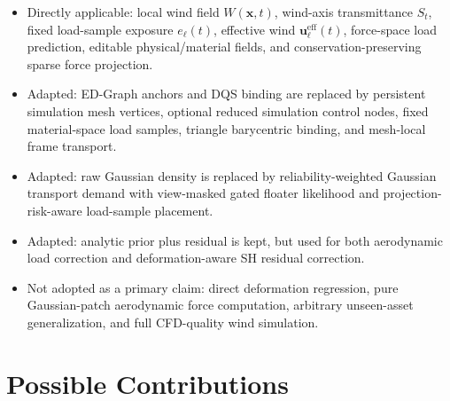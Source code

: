 \documentclass[11pt]{article}
\begin{document}
\begin{itemize}
  \item Directly applicable: local wind field \(W(\mathbf{x},t)\), wind-axis transmittance \(S_t\), fixed load-sample exposure \(e_\ell(t)\), effective wind \(\mathbf{u}^{\mathrm{eff}}_\ell(t)\), force-space load prediction, editable physical/material fields, and conservation-preserving sparse force projection.
  \item Adapted: ED-Graph anchors and DQS binding are replaced by persistent simulation mesh vertices, optional reduced simulation control nodes, fixed material-space load samples, triangle barycentric binding, and mesh-local frame transport.
  \item Adapted: raw Gaussian density is replaced by reliability-weighted Gaussian transport demand with view-masked gated floater likelihood and projection-risk-aware load-sample placement.
  \item Adapted: analytic prior plus residual is kept, but used for both aerodynamic load correction and deformation-aware SH residual correction.
  \item Not adopted as a primary claim: direct deformation regression, pure Gaussian-patch aerodynamic force computation, arbitrary unseen-asset generalization, and full CFD-quality wind simulation.
\end{itemize}

\section{Possible Contributions}
\end{document}
